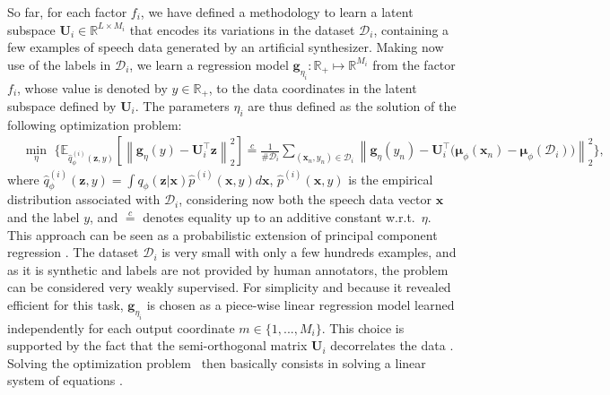 \documentclass[review]{elsarticle}
\begin{document}
So far, for each factor $f_i$, we have defined a methodology to learn a latent subspace $\mathbf{U}_i \in \mathbb{R}^{L \times M_i} $ that encodes its variations in the dataset $\mathcal{D}_i$, containing a few examples of speech data generated by an artificial synthesizer. Making now use of the labels in $\mathcal{D}_i$, we learn a regression model $\mathbf{g}_{\eta_i}: \mathbb{R}_+ \mapsto \mathbb{R}^{M_i}$ from the factor $f_i$, whose value is denoted by $y \in \mathbb{R}_+$, to the data coordinates in the latent subspace defined by $\mathbf{U}_i$. The parameters $\eta_i$ are thus defined as the solution of the following optimization problem:
\begin{align}
    & \min_\eta\,\, \Bigg\{ \mathbb{E}_{\hat{q}_\phi^{(i)}(\mathbf{z} , y)} \left[ \left\lVert \mathbf{g}_{\eta}(y) - \mathbf{U}_i^\top \mathbf{z} \right\rVert_2^2 \right] \overset{c}{=} \frac{1}{\# \mathcal{D}_i} \sum_{(\mathbf{x}_n, y_n) \in \mathcal{D}_i} \left\lVert \mathbf{g}_{\eta}(y_n) - \mathbf{U}_i^\top \big(\boldsymbol{\mu}_{\phi}(\mathbf{x}_n) - \boldsymbol{\mu}_{\phi}(\mathcal{D}_i)\big) \right\rVert_2^2 \Bigg\}, 
    \label{reg_opt_prb_1}
\end{align}
where $\hat{q}_\phi^{(i)}(\mathbf{z} , y) = \int q_\phi(\mathbf{z} | \mathbf{x}) \hat{p}^{(i)}(\mathbf{x}, y) d\mathbf{x} $, $\hat{p}^{(i)}(\mathbf{x}, y)$ is the empirical distribution associated with $\mathcal{D}_i$, considering now both the speech data vector $\mathbf{x}$ and the label $y$, and $\overset{c}{=}$ denotes equality up to an additive constant w.r.t.~$\eta$. This approach can be seen as a probabilistic extension of principal component regression \citep{hotelling1957relations, Kendall}. The dataset $\mathcal{D}_i$ is very small with only a few hundreds examples, and as it is synthetic and labels are not provided by human annotators, the problem can be considered very weakly supervised.
For simplicity and because it revealed efficient for this task, $\mathbf{g}_{\eta_i}$ is chosen as a piece-wise linear regression model learned independently for each output coordinate $m \in \{1,...,M_i\}$. This choice is supported by the fact that the semi-orthogonal matrix $\mathbf{U}_i$ decorrelates the data \citep{bengio2013representation}. Solving the optimization problem~ then basically consists in solving a linear system of equations \citep{jekel2019pwlf}.
\end{document}
